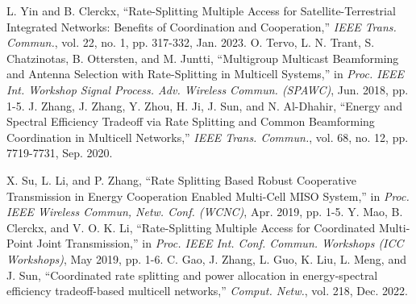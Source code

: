 \documentclass[draftclsnofoot, onecolumn, comsoc, 12pt]{IEEEtran}
\begin{document}
\begin{thebibliography}{1}
 \label{ref:Arxiv_Bruno_RSMAinISTN}
L. Yin and B. Clerckx, ``Rate-Splitting Multiple Access for Satellite-Terrestrial Integrated Networks: Benefits of Coordination and Cooperation,'' \emph{IEEE Trans. Commun.}, vol. 22, no. 1, pp. 317-332, Jan. 2023.
%
 \label{ref:Multicell-RSMA_1}
O. Tervo, L. N. Trant, S. Chatzinotas, B. Ottersten, and M. Juntti, ``Multigroup Multicast Beamforming and Antenna Selection with Rate-Splitting in Multicell Systems,'' in \emph{Proc. IEEE Int. Workshop Signal Process. Adv. Wireless Commun. (SPAWC)}, Jun. 2018, pp. 1-5.
 \label{ref:Multicell-RSMA_2}
J. Zhang, J. Zhang, Y. Zhou, H. Ji, J. Sun, and N. Al-Dhahir, ``Energy and Spectral Efficiency Tradeoff via Rate Splitting and Common Beamforming Coordination in Multicell Networks,'' \emph{IEEE Trans. Commun.}, vol. 68, no. 12, pp. 7719-7731, Sep. 2020.

 \label{ref:Multicell-RSMA_3}
X. Su, L. Li, and P. Zhang, ``Rate Splitting Based Robust Cooperative Transmission in Energy Cooperation Enabled Multi-Cell MISO System,'' in \emph{Proc. IEEE Wireless Commun, Netw. Conf. (WCNC)}, Apr. 2019, pp. 1-5.
 \label{ref:Multicell-RSMA_4}
Y. Mao, B. Clerckx, and V. O. K. Li, ``Rate-Splitting Multiple Access for Coordinated Multi-Point Joint Transmission,'' in \emph{Proc. IEEE Int. Conf. Commun. Workshops (ICC Workshops)}, May 2019, pp. 1-6.
 \label{ref:Multicell-RSMA_5}
C. Gao, J. Zhang, L. Guo, K. Liu, L. Meng, and J. Sun, ``Coordinated rate splitting and power allocation in energy-spectral efficiency tradeoff-based multicell networks,'' \emph{Comput. Netw.}, vol. 218, Dec. 2022.


\end{thebibliography}
\end{document}

